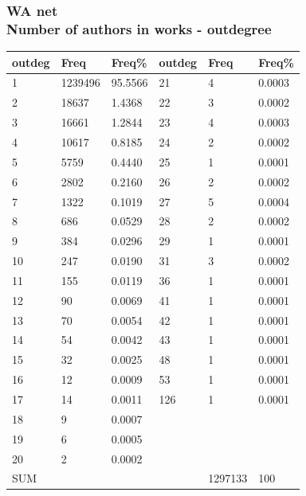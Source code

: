 \documentclass[hyperref={pdfstartview={FitBH -32768},
                         pdfpagemode=FullScreen,
                         plainpages=false,
                         colorlinks=true}
              ]{beamer}
\begin{document}
\begin{frame}[fragile]
\frametitle{WA net \label{numpap}\\ \normalsize Number of authors in works - outdegree}
\renewcommand{\arraystretch}{0.85}
\tiny
\begin{center}
\begin{tabular}{l|l|l||l|l|l}
outdeg&  	Freq&  	Freq\% &  	outdeg&   Freq &	Freq\%\\ \hline   
1&  	1239496&  	95.5566&  	21&  	4&  	0.0003\\
2&  	18637&  	1.4368&  	22&  	3&  	0.0002\\
3&  	16661&  	1.2844&  	23&  	4&  	0.0003\\
4&  	10617&  	0.8185&  	24&  	2&  	0.0002\\
5&  	5759&  	0.4440&  	25&  	1&  	0.0001\\
6&  	2802&  	0.2160&  	26&  	2&  	0.0002\\
7&  	1322&  	0.1019&  	27&  	5&  	0.0004\\
8&  	686&  	0.0529&  	28&  	2&  	0.0002\\
9&  	384&  	0.0296&  	29&  	1&  	0.0001\\
10&  	247&  	0.0190&  	31&  	3&  	0.0002\\
11&  	155&  	0.0119&  	36&  	1&  	0.0001\\
12&  	90&  	0.0069&  	41&  	1&  	0.0001\\
13&  	70&  	0.0054&  	42&  	1&  	0.0001\\
14&  	54&  	0.0042&  	43&  	1&  	0.0001\\
15&  	32&  	0.0025&  	48&  	1&  	0.0001\\
16&  	12&  	0.0009&  	53&  	1&  	0.0001\\
17&  	14&  	0.0011&  	126&  	1&  	0.0001\\
18&  	9&  	0.0007&  	  & 	 & 	\\
19&  	6&  	0.0005&  	 &	 &	\\
20&  	2&  	0.0002&  	&	 &	\\ \hline
SUM &     &              &       &  1297133 & 100  \\ \hline   
\end{tabular}
\end{center}
\medskip

\footnotesize


\end{frame}
\end{document}

